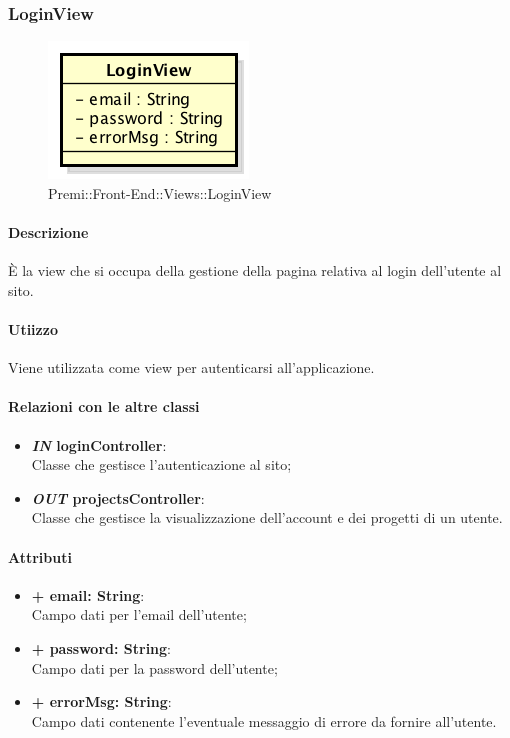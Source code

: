 	
\subsubsection{LoginView}
	\begin{figure}[h]
		\centering
		\includegraphics[width=0.4\linewidth]{img/premi_front_end_views_loginview}
		\caption[Premi::Front-End::Views::LoginView]{Premi::Front-End::Views::LoginView}
	\end{figure}
	
	\paragraph{Descrizione}
	È la view che si occupa della gestione della pagina relativa al login dell'utente al sito.
	
	\paragraph{Utiizzo}
	Viene utilizzata come view per autenticarsi all'applicazione.
	
	\paragraph{Relazioni con le altre classi}
	\begin{itemize}
		\item \textbf{\textit{IN} loginController}:\\
		Classe che gestisce l'autenticazione al sito;
		\item \textbf{\textit{OUT} projectsController}:\\
		Classe che gestisce la visualizzazione dell'account e dei progetti di un utente.
	\end{itemize}
	
	\paragraph{Attributi}
	\begin{itemize}
		\item \textbf{+ email: String}:\\
		Campo dati per l'email dell'utente;
		\item \textbf{+ password: String}:\\
		Campo dati per la password dell'utente;
		\item \textbf{+ errorMsg: String}:\\
		Campo dati contenente l'eventuale messaggio di errore da fornire all'utente.
	\end{itemize}
	
